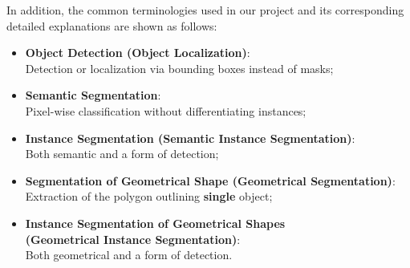 In addition, the common terminologies used in our project and its corresponding detailed explanations are shown as follows:
\begin{itemize}
	\item \textbf{Object Detection (Object Localization)}:\\
	Detection or localization via bounding boxes instead of masks;
	\item \textbf{Semantic Segmentation}:\\
	Pixel-wise classification without differentiating instances;
	\item \textbf{Instance Segmentation (Semantic Instance Segmentation)}:\\
	Both semantic and a form of detection;
	\item \textbf{Segmentation of Geometrical Shape (Geometrical Segmentation)}:\\
	Extraction of the polygon outlining \textbf{single} object;
	\item \textbf{Instance Segmentation of Geometrical Shapes \\ (Geometrical Instance Segmentation)}:\\
	Both geometrical and a form of detection.
\end{itemize}

